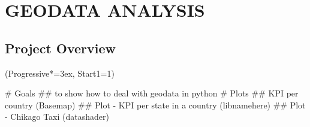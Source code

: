 \documentclass[12pt, a4paper]{article}
\let\OldEasylist\easylist
\let\OldEndEasylist\endeasylist
\renewenvironment{easylist}{%
    \OldEasylist%
    \ListProperties(Progressive*=3ex, Start1=1)%
}{%
    \OldEndEasylist%
}%
\begin{document}
\newpage
\section{GEODATA ANALYSIS}

\subsection{Project Overview}
\begin{easylist}
# Goals
## to show how to deal with geodata in python
# Plots
## KPI per country (Basemap)
## Plot - KPI per state in a country (libnamehere)
## Plot - Chikago Taxi (datashader)
\end{easylist}






\newpage
\nocite{*}


\end{document}

